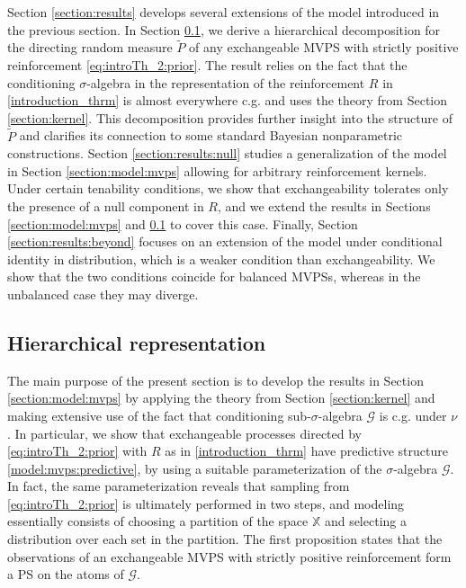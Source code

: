 \documentclass[a4paper]{article}
\theoremstyle{plain}
\theoremstyle{remark}
\theoremstyle{definition}
\begin{document}
Section \ref{section:results} develops several extensions of the model introduced in the previous section. In Section \ref{section:results:hierarchy}, we derive a hierarchical decomposition for the directing random measure $\tilde{P}$ of any exchangeable MVPS with strictly positive reinforcement \eqref{eq:introTh_2:prior}. The result relies on the fact that the conditioning $\sigma$-algebra in the representation of the reinforcement $R$ in \eqref{introduction_thrm} is almost everywhere c.g. and uses the theory from Section \ref{section:kernel}. This decomposition provides further insight into the structure of $\tilde{P}$ and clarifies its connection to some standard Bayesian nonparametric constructions. Section \ref{section:results:null} studies a generalization of the model in Section \ref{section:model:mvps} allowing for arbitrary reinforcement kernels. Under certain tenability conditions, we show that exchangeability tolerates only the presence of a null component in $R$, and we extend the results in Sections \ref{section:model:mvps} and \ref{section:results:hierarchy} to cover this case. Finally, Section \ref{section:results:beyond} focuses on an extension of the model under conditional identity in distribution, which is a weaker condition than exchangeability. We show that the two conditions coincide for balanced MVPSs, whereas in the unbalanced case they may diverge.

\subsection{Hierarchical representation}\label{section:results:hierarchy}

The main purpose of the present section is to develop the results in Section \ref{section:model:mvps} by applying the theory from Section \ref{section:kernel} and making extensive use of the fact that conditioning sub-$\sigma$-algebra $\mathcal{G}$ is c.g. under $\nu$. In particular, we show that exchangeable processes directed by \eqref{eq:introTh_2:prior} with $R$ as in \eqref{introduction_thrm} have predictive structure \eqref{model:mvps:predictive}, by using a suitable parameterization of the $\sigma$-algebra $\mathcal{G}$. In fact, the same parameterization reveals that sampling from \eqref{eq:introTh_2:prior} is ultimately performed in two steps, and modeling essentially consists of choosing a partition of the space $\mathbb{X}$ and selecting a distribution over each set in the partition. The first proposition states that the observations of an exchangeable MVPS with strictly positive reinforcement form a PS on the atoms of $\mathcal{G}$.
\end{document}
